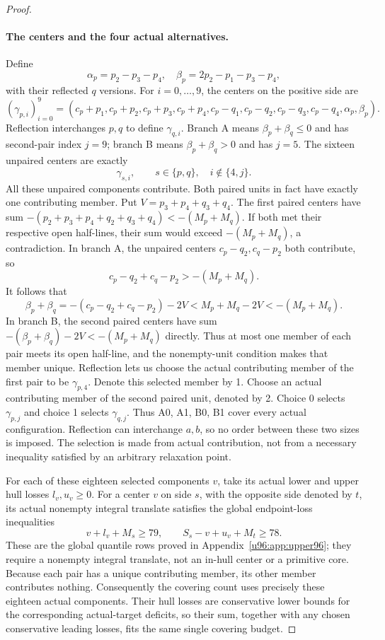 \documentclass[11pt,a4paper]{article}
\theoremstyle{remark}
\begin{document}
\begin{proof}
\paragraph{The centers and the four actual alternatives.}
Define
\[
 \alpha_p=p_2-p_3-p_4,\quad
 \beta_p=2p_2-p_1-p_3-p_4,
\]
with their reflected $q$ versions. For $i=0,\ldots,9$, the centers
on the positive side are
\[
 (\gamma_{p,i})_{i=0}^9=
 (c_p+p_1,c_p+p_2,c_p+p_3,c_p+p_4,
 c_p-q_1,c_p-q_2,c_p-q_3,c_p-q_4,\alpha_p,\beta_p).
\]
Reflection interchanges $p,q$ to define $\gamma_{q,i}$. Branch A means
$\beta_p+\beta_q\le0$ and has second-pair index $j=9$;
branch B means $\beta_p+\beta_q>0$ and has $j=5$.
The sixteen unpaired centers are exactly
\[
 \gamma_{s,i},\qquad s\in\{p,q\},\quad i\notin\{4,j\}.
\]
All these unpaired components contribute. Both paired units in fact have
exactly one contributing member. Put
$V=p_3+p_4+q_3+q_4$. The first paired centers have sum
$-(p_2+p_3+p_4+q_2+q_3+q_4)<-(M_p+M_q)$.
If both met their respective open half-lines, their sum would exceed
$-(M_p+M_q)$, a contradiction.
In branch A, the unpaired centers $c_p-q_2,c_q-p_2$ both contribute, so
\[
 c_p-q_2+c_q-p_2>-(M_p+M_q).
\]
It follows that
\[
 \beta_p+\beta_q
 =-(c_p-q_2+c_q-p_2)-2V
 <M_p+M_q-2V<-(M_p+M_q).
\]
In branch B, the second paired centers have sum
$-(\beta_p+\beta_q)-2V<-(M_p+M_q)$ directly.
Thus at most one member of each pair meets its open half-line, and the
nonempty-unit condition makes that member unique. Reflection lets us
choose the actual contributing member of the first pair to be
$\gamma_{p,4}$. Denote this selected member by 1. Choose an actual
contributing member of the second paired unit, denoted by 2.
Choice 0 selects $\gamma_{p,j}$ and choice 1 selects $\gamma_{q,j}$.
Thus A0, A1, B0, B1 cover every actual configuration. Reflection can
interchange $a,b$, so no order between these two sizes is imposed.
The selection is made from actual contribution, not from a necessary
inequality satisfied by an arbitrary relaxation point.

For each of these eighteen selected components $v$, take its actual
lower and upper hull losses $l_v,u_v\ge0$. For a center $v$ on side $s$,
with the opposite side denoted by $t$, its actual nonempty integral
translate satisfies the global endpoint-loss inequalities
\[
 v+l_v+M_s\ge79,\qquad S_s-v+u_v+M_t\ge78.
\]
These are the global quantile rows proved in
Appendix~\ref{u96:app:upper96}; they require a nonempty integral
translate, not an in-hull center or a primitive core. Because each pair
has a unique contributing member, its other member contributes nothing.
Consequently the covering count uses precisely these eighteen actual
components. Their hull losses are conservative lower bounds for the
corresponding actual-target deficits, so their sum, together with any
chosen conservative leading losses, fits the same single covering budget.


\end{proof}
\end{document}
